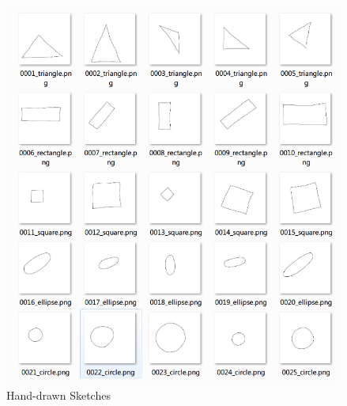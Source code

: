 \begin{figure}[ht!]
\includegraphics[]{Figure_2_Sketch_Image.png}
\caption{Hand-drawn Sketches}
\end{figure}

